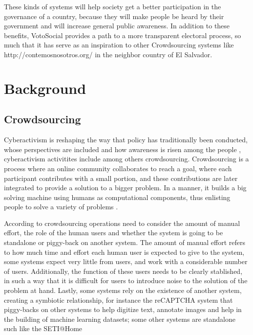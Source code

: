 \documentclass[a4paper,10pt]{article}
\begin{document}
These kinds of systems will help society get a better participation in the governance of a country, because they will make people be heard by their government and will increase general public awareness. In addition to these benefits, VotoSocial provides a path to a more transparent electoral process, so much that it has serve as an inspiration to other Crowdsourcing systems like http://contemosnosotros.org/ in the neighbor country of El Salvador. 



\section{Background}
\subsection{Crowdsourcing}

Cyberactivism is reshaping the way that policy has traditionally been conducted, whose perspectives are included and how awareness is risen among the people \citep{milan2013}, cyberactivism activitites include among others crowdsourcing. Crowdsourcing is a process where an online community collaborates to reach a goal, where each participant contributes with a small portion, and these contributions are later integrated to provide a solution to a bigger problem. In a manner, it builds a big solving machine using humans as computational components, thus enlisting people to solve a variety of problems \citep{doan2011}.

According to \cite{doan2011} crowdsourcing operations need to consider the amount of manual effort, the role of the human users and whether the system is going to be standalone or piggy-back on another system. The amount of manual effort refers to how much time and effort each human user is expected to give to the system, some systems expect very little from users, and work with a considerable number of users. Additionally, the function of these users needs to be clearly stablished, in such a way that it is difficult for users to introduce noise to the solution of the problem at hand. Lastly, some systems rely on the existence of another system, creating a symbiotic relationship, for instance the reCAPTCHA system that piggy-backs on other systems to help digitize text, annotate images and help in the building of machine learning datasets; some other systems are standalone such like the SETI@Home 
\end{document}
